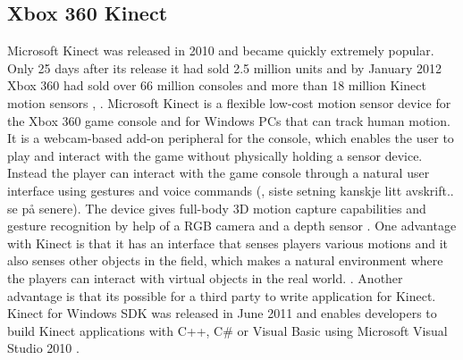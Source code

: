 \subsection{Xbox 360 Kinect}
Microsoft Kinect was released in 2010 and became quickly extremely popular. Only 25 days after its release it had sold 2.5 million units and by January 2012 Xbox 360 had sold over 66 million consoles and more than 18 million Kinect motion sensors \cite{consoles},  \cite{kinectsold}. Microsoft Kinect is a flexible low-cost motion sensor device for the Xbox 360 game console  and for Windows PCs that can track human motion. It is a webcam-based add-on peripheral for the console, which enables the user to play and interact with the game without physically holding a sensor device. Instead the player can interact with the game console through a natural user interface using gestures and voice commands (\cite{kinect}, siste setning kanskje litt avskrift.. se på senere). The device gives full-body 3D motion capture capabilities and gesture recognition by help of a RGB camera and a depth sensor \cite{kinect}. One advantage with Kinect is that it has an interface that senses players various motions and it also senses other objects in the field, which makes a natural environment where the players can interact with virtual objects in the real world. \cite{comparison}. Another advantage  is that its possible for a third party to write application for Kinect. Kinect for Windows SDK was released in June 2011 and enables developers to build Kinect applications with C++, C\# or Visual Basic using Microsoft Visual Studio 2010 \cite{kinectwindows}.

